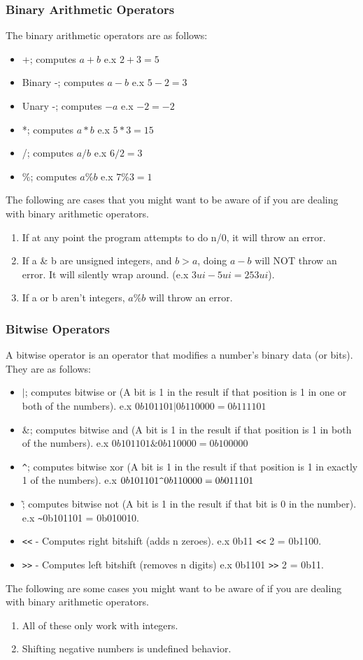 \documentclass[12pt, letterpaper, oneside]{article}
\begin{document}
	\subsubsection{Binary Arithmetic Operators}
	The binary arithmetic operators are as follows:
	\begin{itemize}
		\item[--] +; computes $a+b$ e.x $2+3 = 5$
		\item[--] Binary -; computes $a-b$ e.x $5-2 = 3$
		\item[--] Unary -; computes $-a$ e.x $-2 = -2$
		\item[--] *; computes $a*b$ e.x $5*3 = 15$
		\item[--] /; computes $a/b$ e.x $6/2 = 3$
		\item[--] \%; computes $a\%b$ e.x $7\%3 = 1$
	\end{itemize}
	The following are cases that you might want to be aware of if you are dealing with binary arithmetic operators.
	\begin{enumerate}
		\item If at any point the program attempts to do n/0, it will throw an error. 
		\item If a \& b are unsigned integers, and $b > a$, doing $a-b$ will NOT throw an error. It will silently wrap around. (e.x $3ui-5ui = 253ui$).  
		\item If a or b aren't integers, $a \% b$ will throw an error.
	\end{enumerate}
	\subsubsection{Bitwise Operators}
	A bitwise operator is an operator that modifies a number's binary data (or bits). They are as follows:
	\begin{itemize}
		\item[--] $\vert$; computes bitwise or (A bit is 1 in the result if that position is 1 in one or both of the numbers). e.x $0b101101 \vert 0b110000 = 0b111101$
		\item[--] \&; computes bitwise and (A bit is 1 in the result if that position is 1 in both of the numbers). e.x $0b101101 \& 0b110000 = 0b100000$
		\item[--] \verb|^|; computes bitwise xor (A bit is 1 in the result if that position is 1 in exactly 1 of the numbers). e.x $0b101101 \verb|^| 0b110000 = 0b011101$
		\item[--] \~; computes bitwise not (A bit is 1 in the result if that bit is 0 in the number). e.x \verb|~|0b101101 = 0b010010.
		\item[--] \verb|<<| - Computes right bitshift (adds n zeroes). e.x 0b11 \verb|<<| 2 = 0b1100.
		\item[--] \verb|>>| - Computes left bitshift (removes n digits) e.x 0b1101 \verb|>>| 2 = 0b11.
	\end{itemize}
	The following are some cases you might want to be aware of if you are dealing with binary arithmetic operators.
	\begin{enumerate}
		\item All of these only work with integers.
		\item Shifting negative numbers is undefined behavior.
	\end{enumerate} 
\end{document}
